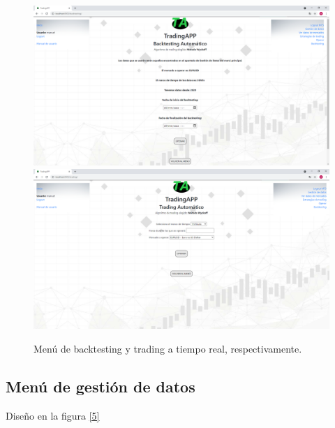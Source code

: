 \begin{figure}[h]
	\includegraphics[width=1.2\textwidth]{imagenes/diseno_final/menu_backtesting.png}\newline \\
	\includegraphics[width=1.2\textwidth]{imagenes/diseno_final/menu_trading_tiempo_real.png}
	
	\caption{Menú de backtesting y trading a tiempo real, respectivamente.}  \label{4}
\end{figure}

\subsection{Menú de gestión de datos}
Diseño en la figura \ref{5}


